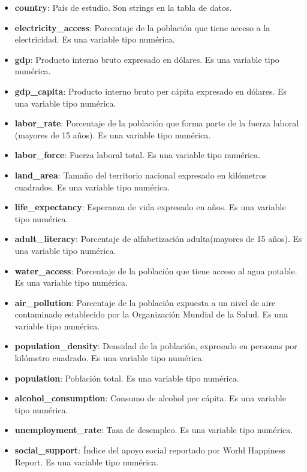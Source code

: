 \documentclass[12pt,oneside,letterpaper,spanish]{article}
\begin{document}
\begin{itemize}
    \begin{itemize}
        \item \textbf{country}: País de estudio. Son strings en la tabla de datos.
        \item \textbf{electricity\_access}: Porcentaje de la población que tiene acceso a la electricidad. Es una variable tipo numérica.
        \item \textbf{gdp}: Producto interno bruto expresado en dólares. Es una variable tipo numérica.
        \item \textbf{gdp\_capita}: Producto interno bruto per cápita expresado en dólares. Es una variable tipo numérica.
        \item \textbf{labor\_rate}: Porcentaje de la población que forma parte de la fuerza laboral (mayores de 15 años). Es una variable tipo numérica.
        \item \textbf{labor\_force}: Fuerza laboral total. Es una variable tipo numérica.
        \item \textbf{land\_area}: Tamaño del territorio nacional expresado en kilómetros cuadrados. Es una variable tipo numérica.
        \item \textbf{life\_expectancy}: Esperanza de vida expresado en años. Es una variable tipo numérica.
        \item \textbf{adult\_literacy}: Porcentaje de alfabetización adulta(mayores de 15 años). Es una variable tipo numérica.
        \item \textbf{water\_access}: Porcentaje de la población que tiene acceso al agua potable. Es una variable tipo numérica.
        \item \textbf{air\_pollution}: Porcentaje de la población expuesta a un nivel de aire contaminado establecido por la Organización Mundial de la Salud. Es una variable tipo numérica.
        \item \textbf{population\_density}: Densidad de la población, expresado en personas por kilómetro cuadrado. Es una variable tipo numérica.
        \item \textbf{population}: Población total. Es una variable tipo numérica.
        \item \textbf{alcohol\_consumption}: Consumo de alcohol per cápita. Es una variable tipo numérica.
        \item \textbf{unemployment\_rate}: Tasa de desempleo. Es una variable tipo numérica.
        \item \textbf{social\_support}: Índice del apoyo social reportado por World Happiness Report. Es una variable tipo numérica.

\end{itemize}
\end{itemize}
\end{document}

